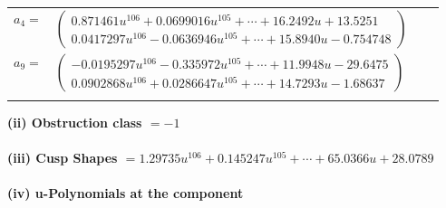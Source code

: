\documentclass[1p]{elsarticle_modified}
\theoremstyle{definition}
\begin{document}
\begin{tabular}{m{7pt} m{180pt} m{7pt} m{180pt} }
\flushright $a_{4}=$&$\begin{pmatrix}0.871461 u^{106}+0.0699016 u^{105}+\cdots+16.2492 u+13.5251\\0.0417297 u^{106}-0.0636946 u^{105}+\cdots+15.8940 u-0.754748\end{pmatrix}$ \\
\flushright $a_{9}=$&$\begin{pmatrix}-0.0195297 u^{106}-0.335972 u^{105}+\cdots+11.9948 u-29.6475\\0.0902868 u^{106}+0.0286647 u^{105}+\cdots+14.7293 u-1.68637\end{pmatrix}$\\&\end{tabular}
\flushleft \textbf{(ii) Obstruction class $= -1$}\\~\\
\flushleft \textbf{(iii) Cusp Shapes $= 1.29735 u^{106}+0.145247 u^{105}+\cdots+65.0366 u+28.0789$}\\~\\
\newpage\renewcommand{\arraystretch}{1}
\flushleft \textbf{(iv) u-Polynomials at the component}\newline \\
\end{document}
